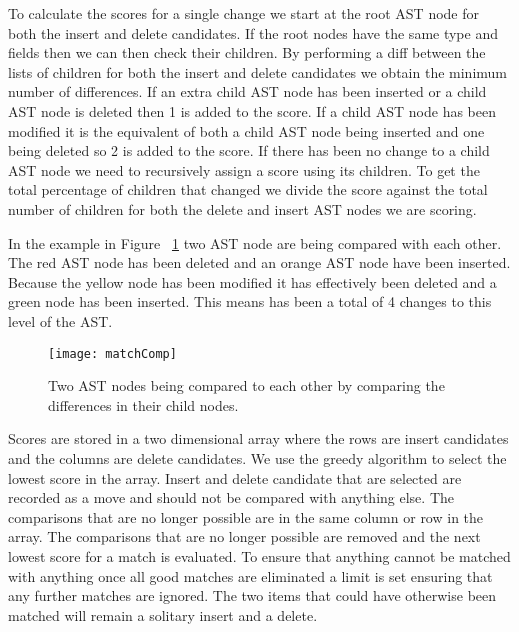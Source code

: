% 

To calculate the scores for a single change we start at the root AST node for both the insert and delete candidates.  
If the root nodes have the same type and fields then we can then check their children. 
By performing a diff between the lists of children for both the insert and delete candidates we obtain the minimum number of differences.  
If an extra child AST node has been inserted or a child AST node is deleted then 1 is added to the score. 
If a child AST node has been modified it is the equivalent of both a child AST node being inserted and one being deleted so 2 is added to the score. 
If there has been no change to a child AST node we need to recursively assign a score using its children. 
To get the total percentage of children that changed we divide the score against the total number of children for both the delete and insert AST nodes we are scoring.

In the example in Figure ~\ref{fig:matchComp} two AST node are being compared with each other. The red AST node has been deleted and an orange AST node have been inserted. Because the yellow node has been modified it has effectively been deleted and a green node has been inserted. This means has been a total of 4 changes to this level of the AST. 

\begin{figure}[!t]
 \begin{center}
 \texttt{[image: matchComp]}
 \end{center}
 \caption{Two AST nodes being compared to each other by comparing the differences in their child nodes.}
 \label{fig:matchComp}
\end{figure}

Scores are stored in a two dimensional array where the rows are insert candidates and the columns are delete candidates.  We use the greedy algorithm to select the lowest score in the array.  Insert and delete candidate that are selected are recorded as a move and should not be compared with anything else. The comparisons that are no longer possible are in the same column or row in the array.  The comparisons that are no longer possible are removed and the next lowest score for a match is evaluated.  To ensure that anything cannot be matched with anything once all good matches are eliminated a limit is set ensuring that any further matches are ignored.  The two items that could have otherwise been matched will remain a solitary insert and a delete.


